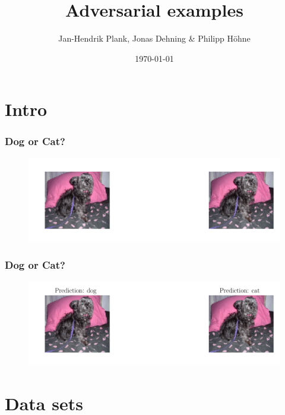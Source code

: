 \documentclass[handout]{beamer}
\begin{document}
\title{Adversarial examples}
\author{Jan-Hendrik Plank, Jonas Dehning \& Philipp Höhne}
\date{\today} 


\begin{frame}
\titlepage
\end{frame} 

\section{Intro}

\begin{frame}
\frametitle{Dog or Cat?}
\begin{figure}
\includegraphics[width=\linewidth]{../figures/dog_vs_cat1.pdf}
\end{figure}
\end{frame} 

\begin{frame}
\frametitle{Dog or Cat?}
\begin{figure}
\includegraphics[width=\linewidth]{../figures/dog_vs_cat2.pdf}
\end{figure}
\end{frame}

\section{Data sets}
\end{document}

